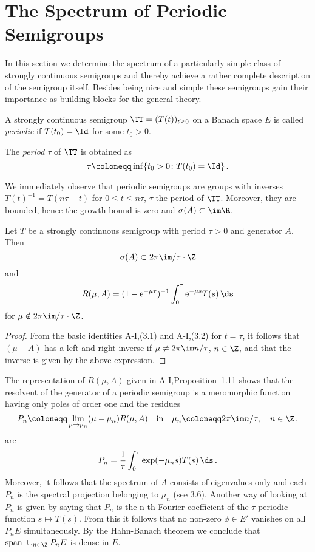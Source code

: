 \section{The Spectrum of Periodic Semigroups}\label{sec:a3-5}
In this section we determine the spectrum of a particularly simple class of strongly continuous semigroups and thereby achieve a rather complete description of the semigroup itself.
Besides being nice and simple these semigroups gain their importance as building blocks for the general theory.
\begin{definition}\label{def:a3-5.1}
A strongly continuous semigroup $\TT = (T(t))_{t \geq 0}$ on a Banach space $E$ is called \emph{periodic} if $T(t_{0}) = \Id$ for some $t_{0} > 0$.

The \emph{period} $\tau$ of $\TT$ is obtained as 
%
\[
	\tau \coloneqq \inf\{t_{0} > 0 \colon T(t_{0}) = \Id\}\,.
\]
%
\end{definition}
We immediately observe that periodic semigroups are groups with inverses $T(t)^{-1} = T(n\tau-t)$ for $0 \leq t \leq n\tau$, $\tau$ the period of $\TT$.
Moreover, they are bounded, hence the growth bound is zero and $\sigma(A) \subset \im\R$.
\begin{lemma}\label{lem:a3-5.2}
Let $T$ be a strongly continuous semigroup with period $\tau > 0$ and generator $A$.
Then
\[
\sigma(A) \subset 2\pi \im/\tau\cdot\Z
\]
and
\begin{equation}\label{eq:a3-5.1}
R(\mu,A) = (1-\mathrm{e}^{-\mu\tau})^{-1} \int_{0}^{\tau}\mathrm{e}^{-\mu s}T(s) \, \ds
\end{equation}
for $\mu \notin 2\pi\im /\tau\cdot\Z$.
\end{lemma}
\begin{proof}
From the basic identities A-I,(3.1) and A-I,(3.2) for $t = \tau$, it follows that $(\mu - A)$ has a left and right inverse if $\mu \neq 2\pi\im n/\tau$, $n \in \Z$, and that the inverse is given by the above expression.
\end{proof}
The representation of $R(\mu,A)$ given in A-I,Proposition~1.11 shows that the resolvent of the generator of a periodic semigroup is a meromorphic function having only poles of order one and the residues
\[
P_{n} \coloneqq \lim_{\mu \to \mu_{n}} (\mu-\mu_{n})R(\mu,A) \quad \text{in} \quad \mu_{n} \coloneqq 2\pi\im n/\tau, \quad n \in \Z\,,
\]
are
\begin{equation}\label{eq:a3-5.2}
P_{n} = \frac{1}{\tau}\int_{0}^{\tau}\exp(-\mu_{n}s)T(s) \, \ds\,.
\end{equation}
Moreover, it follows that the spectrum of $A$ consists of eigenvalues only and each $P_{n}$ is the spectral projection belonging to $\mu_{n}$ (see 3.6). 
Another way of looking at $P_{n}$ is given by saying that $P_{n}$ is the n-th Fourier coefficient of the $\tau$-periodic function $s \mapsto T(s)$.
From this it follows that no non-zero $\phi \in E'$ vanishes on all $P_{n}E$ simultaneously.
By the Hahn-Banach theorem we conclude that $\text{span } \cup_{n \in \Z} P_{n}E$ is dense in $E$.

